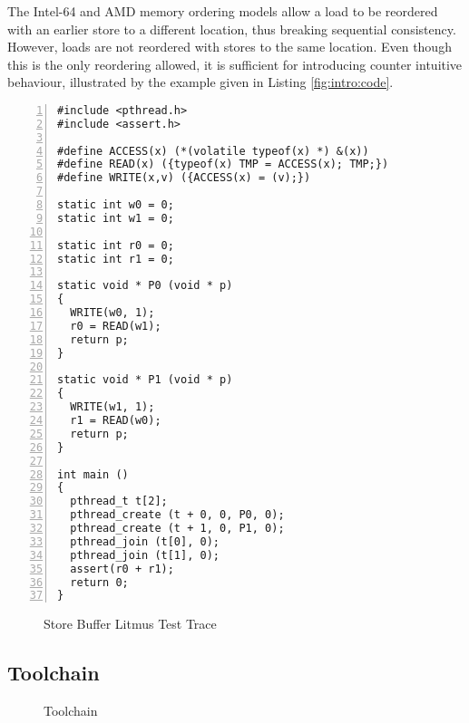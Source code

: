 \bigskip

The Intel-64 and AMD memory ordering models allow a load to be reordered with an earlier store to a different location, thus breaking sequential consistency.
However, loads are not reordered with stores to the same location.
Even though this is the only reordering allowed, it is sufficient for introducing counter intuitive behaviour, illustrated by the example given in Listing \ref{fig:intro:code}.

\newpage

\begin{lstlisting}[style=c++, numbers=left, numberstyle=\footnotesize, numberblanklines=false, caption={Store Buffer Litmus Test}, label={fig:intro:code}]
#include <pthread.h>
#include <assert.h>

#define ACCESS(x) (*(volatile typeof(x) *) &(x))
#define READ(x) ({typeof(x) TMP = ACCESS(x); TMP;})
#define WRITE(x,v) ({ACCESS(x) = (v);})

static int w0 = 0;
static int w1 = 0;

static int r0 = 0;
static int r1 = 0;

static void * P0 (void * p)
{
  WRITE(w0, 1);
  r0 = READ(w1);
  return p;
}

static void * P1 (void * p)
{
  WRITE(w1, 1);
  r1 = READ(w0);
  return p;
}

int main ()
{
  pthread_t t[2];
  pthread_create (t + 0, 0, P0, 0);
  pthread_create (t + 1, 0, P1, 0);
  pthread_join (t[0], 0);
  pthread_join (t[1], 0);
  assert(r0 + r1);
  return 0;
}
\end{lstlisting}

\begin{figure}[!h]
  \centering
  
  \caption{Store Buffer Litmus Test Trace}
\end{figure}



\subsection{Toolchain}

\begin{figure}[h]
  \centering
  
  \caption{Toolchain}
\end{figure}

